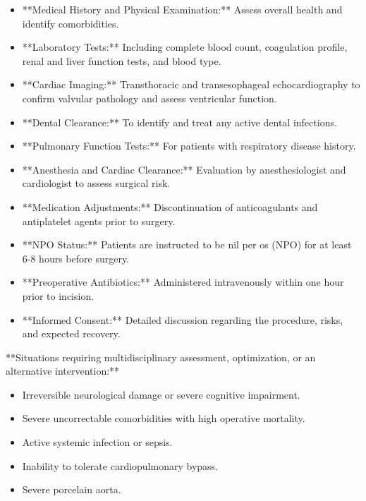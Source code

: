 \begin{itemize}
  \item **Medical History and Physical Examination:** Assess overall health and identify comorbidities.
  
  \item **Laboratory Tests:** Including complete blood count, coagulation profile, renal and liver function tests, and blood type.
  
  \item **Cardiac Imaging:** Transthoracic and transesophageal echocardiography to confirm valvular pathology and assess ventricular function.
  
  \item **Dental Clearance:** To identify and treat any active dental infections.
  
  \item **Pulmonary Function Tests:** For patients with respiratory disease history.
  
  \item **Anesthesia and Cardiac Clearance:** Evaluation by anesthesiologist and cardiologist to assess surgical risk.
  
  \item **Medication Adjustments:** Discontinuation of anticoagulants and antiplatelet agents prior to surgery.
  
  \item **NPO Status:** Patients are instructed to be nil per os (NPO) for at least 6-8 hours before surgery.
  
  \item **Preoperative Antibiotics:** Administered intravenously within one hour prior to incision.
  
  \item **Informed Consent:** Detailed discussion regarding the procedure, risks, and expected recovery.
\end{itemize}

**Situations requiring multidisciplinary assessment, optimization, or an alternative intervention:**

\begin{itemize}
  \item Irreversible neurological damage or severe cognitive impairment.
  \item Severe uncorrectable comorbidities with high operative mortality.
  \item Active systemic infection or sepsis.
  \item Inability to tolerate cardiopulmonary bypass.
  \item Severe porcelain aorta.
\end{itemize}

